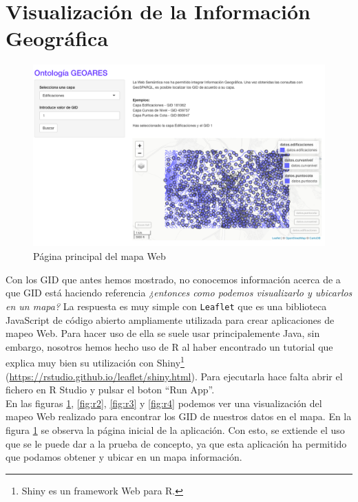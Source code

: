 \section{Visualización de la Información Geográfica}
\label{ch:visualizacion}


\begin{figure}[H]
	\centering
	\includegraphics[width=1\linewidth]{imagenes/capitulo5/R1}
	\caption{Página principal del mapa Web}
	\label{fig:r1}
\end{figure}

Con los GID que antes hemos mostrado, no conocemos información acerca de a que GID está haciendo referencia \textit{¿entonces como podemos visualizarlo y ubicarlos en un mapa?} La respuesta es muy simple con \texttt{Leaflet} que es una biblioteca JavaScript de código abierto ampliamente utilizada para crear aplicaciones de mapeo Web. Para hacer uso de ella se suele usar principalemente Java, sin embargo, nosotros hemos hecho uso de R al haber encontrado un tutorial que explica muy bien su utilización con Shiny\footnote{Shiny es un framework Web para R.} (\url{https://rstudio.github.io/leaflet/shiny.html}). Para ejecutarla hace falta abrir el fichero en R Studio y pulsar el boton ``Run App''.\\


En las figuras \ref{fig:r1},  \ref{fig:r2}, \ref{fig:r3} y \ref{fig:r4} podemos ver una visualización del mapeo Web realizado para encontrar los GID de nuestros datos en el mapa. En la figura \ref{fig:r1} se observa la página inicial de la aplicación. Con esto, se extiende el uso que se le puede dar a la prueba de concepto, ya que esta aplicación ha permitido que podamos obtener y ubicar en un mapa información.\\



